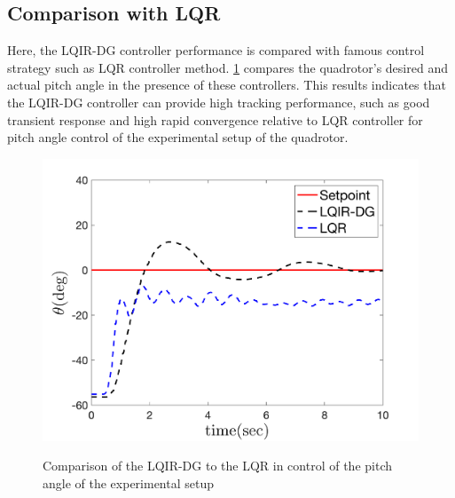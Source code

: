 \documentclass[conference]{IEEEtran}
\begin{document}


\subsection{Comparison with LQR}
\noindent Here, the LQIR-DG controller performance is compared with famous control strategy such as LQR controller method. \figurename{\ref{fig:compare}} compares the quadrotor's desired and actual pitch angle in the presence of these controllers. This results indicates that the LQIR-DG controller can provide high tracking performance, such as good transient response and high rapid convergence relative to LQR controller for pitch angle control of the experimental setup of the quadrotor.
\begin{figure}[!h]
	\centering
	{\includegraphics[width=\linewidth]{../Figures/Calibration/LQIDGvsLQR/Pitch/lqidgvslqr_pitch.png}
	}
	\caption{Comparison of the LQIR-DG to the LQR in control of the pitch angle of the experimental setup}
	\label{fig:compare}
\end{figure}
\end{document}
